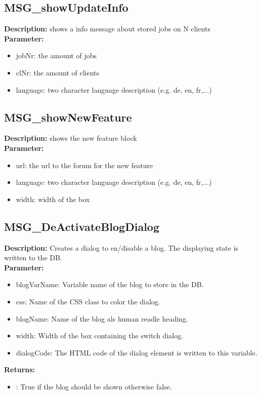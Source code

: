 \subsection{MSG\_showUpdateInfo}
\textbf{Description:} shows a info message about stored jobs on N clients\\
\textbf{Parameter:}
\begin{itemize}
\item jobNr: the amount of jobs
\item clNr: the amount of clients
\item language: two character language description (e.g. de, en, fr,...)
\end{itemize}

\subsection{MSG\_showNewFeature}
\textbf{Description:} shows the new feature block\\
\textbf{Parameter:}
\begin{itemize}
\item url: the url to the forum for the new feature
\item language: two character language description (e.g. de, en, fr,...)
\item width: width of the box
\end{itemize}

\subsection{MSG\_DeActivateBlogDialog}
\textbf{Description:} Creates a dialog to en/disable a blog. The displaying state is written to the DB.\\
\textbf{Parameter:}
\begin{itemize}
\item blogVarName: Variable name of the blog to store in the DB.
\item css: Name of the CSS class to color the dialog.
\item blogName: Name of the blog als human readle heading.
\item width: Width of the box containing the switch dialog.
\item dialogCode: The HTML code of the dialog element is written to this variable.
\end{itemize}
\textbf{Returns:}
\begin{itemize}
\item : True if the blog should be shown otherwise false.
\end{itemize}

